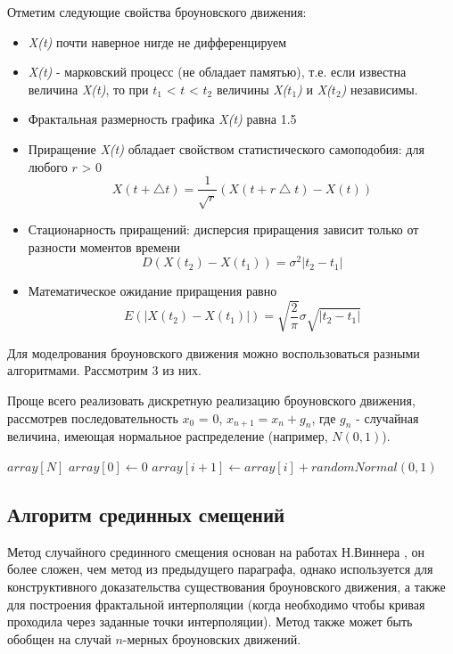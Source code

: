 Отметим следующие свойства броуновского движения:
\begin{itemize} 
	\item \textit{X(t)} почти наверное нигде не дифференцируем 
	\item  \textit{X(t)} - марковский процесс (не обладает памятью), т.е. если известна величина \textit{X(t)}, то при $t_1$ < $t$ < $t_2$ величины \textit{X($t_1$)} и \textit{X($t_2$)} независимы.
	\item Фрактальная размерность графика \textit{X(t)} равна 1.5
	\item Приращение \textit{X(t)} обладает свойством статистического самоподобия: для любого $r$ > 0
	\begin{equation}
		X(t+ \bigtriangleup t) = \frac{1}{\sqrt{r}}(X(t+r\bigtriangleup t) - X(t))
	\end{equation}
	\item Стационарность приращений: дисперсия приращения зависит только от разности моментов времени
	\begin{equation} \label{1.6}
		D(X(t_2) - X(t_1)) = \sigma^2|t_2-t_1|
	\end{equation}
	\item Математическое ожидание приращения равно
	\begin{equation}
		E(|X(t_2) - X(t_1)|) = \sqrt{\frac{2}{\pi}}\sigma\sqrt{|t_2-t_1|}
	\end{equation}
\end{itemize}

Для моделрования броуновского движения можно воспользоваться разными алгоритмами. Рассмотрим 3 из них.

Проще всего реализовать дискретную реализацию броуновского движения, рассмотрев последовательность $x_0$ = 0, $x_{n+1} = x_n + g_n$, где $g_n$ - случайная величина, имеющая нормальное распределение (например, $N(0,1)$).

\begin{algorithmic}[1]
	\State $array[N]$
	\State $array[0]\gets 0$
	\State $array[i+1]\gets array[i] + randomNormal(0,1)$
	\EndFor
\end{algorithmic}

\subsection{Алгоритм срединных смещений}

Метод случайного срединного смещения основан на работах Н.Виннера , он более сложен, чем метод из предыдущего параграфа, однако используется для конструктивного доказательства существования броуновского движения, а также для построения фрактальной интерполяции (когда необходимо чтобы кривая проходила через заданные точки интерполяции). Метод также может быть обобщен на случай $n$-мерных броуновских движений.

